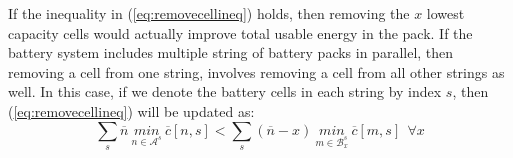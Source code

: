 \documentclass[10pt,twocolumn]{IEEEtran}
\begin{document}
If the inequality in (\ref{eq:removecellineq}) holds, then removing the $x$ lowest capacity cells would actually improve total usable energy in the pack. 
If the battery system includes multiple string of battery packs in parallel, then removing a cell from one string, involves removing a cell from all other strings as well.
In this case, if we denote the battery cells in each string by index $s$,  then (\ref{eq:removecellineq}) will be updated  as:
%
\begin{equation}
\sum_{s} \overline{n} \  \underset{n\in \mathcal{A}^s}{min} \ \overline c[n,s] <  \sum_{s}(\overline{n}-x) \ \underset{m\in \mathcal{B}^{s}_x}{min} \ \overline c[m,s] \ \  \forall x
\label{eq:removecellineq2}
\end{equation}
%
%
\end{document}
